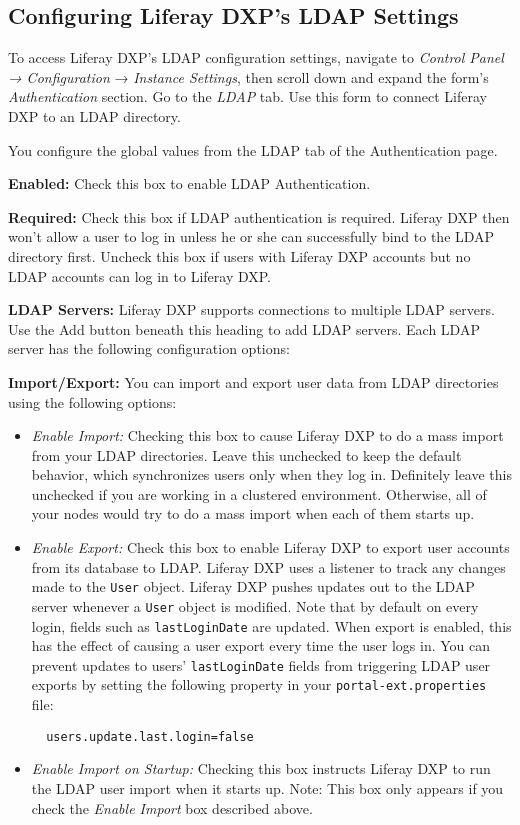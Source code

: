 \subsection{Configuring Liferay DXP's LDAP
Settings}\label{configuring-liferay-dxps-ldap-settings}

To access Liferay DXP's LDAP configuration settings, navigate to
\emph{Control Panel → Configuration} → \emph{Instance Settings}, then
scroll down and expand the form's \emph{Authentication} section. Go to
the \emph{LDAP} tab. Use this form to connect Liferay DXP to an LDAP
directory.

You configure the global values from the LDAP tab of the Authentication
page.

\textbf{Enabled:} Check this box to enable LDAP Authentication.

\textbf{Required:} Check this box if LDAP authentication is required.
Liferay DXP then won't allow a user to log in unless he or she can
successfully bind to the LDAP directory first. Uncheck this box if users
with Liferay DXP accounts but no LDAP accounts can log in to Liferay
DXP.

\textbf{LDAP Servers:} Liferay DXP supports connections to multiple LDAP
servers. Use the Add button beneath this heading to add LDAP servers.
Each LDAP server has the following configuration options:

\textbf{Import/Export:} You can import and export user data from LDAP
directories using the following options:

\begin{itemize}
\item
  \emph{Enable Import:} Checking this box to cause Liferay DXP to do a
  mass import from your LDAP directories. Leave this unchecked to keep
  the default behavior, which synchronizes users only when they log in.
  Definitely leave this unchecked if you are working in a clustered
  environment. Otherwise, all of your nodes would try to do a mass
  import when each of them starts up.
\item
  \emph{Enable Export:} Check this box to enable Liferay DXP to export
  user accounts from its database to LDAP. Liferay DXP uses a listener
  to track any changes made to the \texttt{User} object. Liferay DXP
  pushes updates out to the LDAP server whenever a \texttt{User} object
  is modified. Note that by default on every login, fields such as
  \texttt{lastLoginDate} are updated. When export is enabled, this has
  the effect of causing a user export every time the user logs in. You
  can prevent updates to users' \texttt{lastLoginDate} fields from
  triggering LDAP user exports by setting the following property in your
  \texttt{portal-ext.properties} file:

\begin{verbatim}
  users.update.last.login=false
\end{verbatim}
\item
  \emph{Enable Import on Startup:} Checking this box instructs Liferay
  DXP to run the LDAP user import when it starts up. Note: This box only
  appears if you check the \emph{Enable Import} box described above.
\end{itemize}

